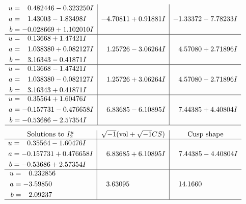 \documentclass[1p]{elsarticle_modified}
\theoremstyle{definition}
\newcommand{\I}{\sqrt{-1}}
\begin{document}
$$\begin{array}{c|c|c}
\begin{aligned}
u &= \phantom{-}0.482446 - 0.323250 I \\
a &= \phantom{-}1.43003 - 1.83498 I \\
b &= -0.028669 + 1.102010 I\end{aligned}
 & -4.70811 + 0.91881 I & -1.33372 - 7.78233 I \\ \hline\begin{aligned}
u &= \phantom{-}0.13668 + 1.47421 I \\
a &= \phantom{-}1.038380 + 0.082127 I \\
b &= \phantom{-}3.16343 - 0.41871 I\end{aligned}
 & \phantom{-}1.25726 - 3.06264 I & \phantom{-}4.57080 + 2.71896 I \\ \hline\begin{aligned}
u &= \phantom{-}0.13668 - 1.47421 I \\
a &= \phantom{-}1.038380 - 0.082127 I \\
b &= \phantom{-}3.16343 + 0.41871 I\end{aligned}
 & \phantom{-}1.25726 + 3.06264 I & \phantom{-}4.57080 - 2.71896 I \\ \hline\begin{aligned}
u &= \phantom{-}0.35564 + 1.60476 I \\
a &= -0.157731 - 0.476658 I \\
b &= -0.53686 - 2.57354 I\end{aligned}
 & \phantom{-}6.83685 - 6.10895 I & \phantom{-}7.44385 + 4.40804 I\\
 \hline 
 \end{array}$$\newpage$$\begin{array}{c|c|c}  
\text{Solutions to }I^u_{2}& \I (\text{vol} + \sqrt{-1}CS) & \text{Cusp shape}\\
 \hline 
\begin{aligned}
u &= \phantom{-}0.35564 - 1.60476 I \\
a &= -0.157731 + 0.476658 I \\
b &= -0.53686 + 2.57354 I\end{aligned}
 & \phantom{-}6.83685 + 6.10895 I & \phantom{-}7.44385 - 4.40804 I \\ \hline\begin{aligned}
u &= \phantom{-}0.232856\phantom{ +0.000000I} \\
a &= -3.59850\phantom{ +0.000000I} \\
b &= \phantom{-}2.09237\phantom{ +0.000000I}\end{aligned}
 & \phantom{-}3.63095\phantom{ +0.000000I} & \phantom{-}14.1660\phantom{ +0.000000I}\\
 \hline 
 \end{array}$$\newpage\newpage\renewcommand{\arraystretch}{1}
\end{document}
